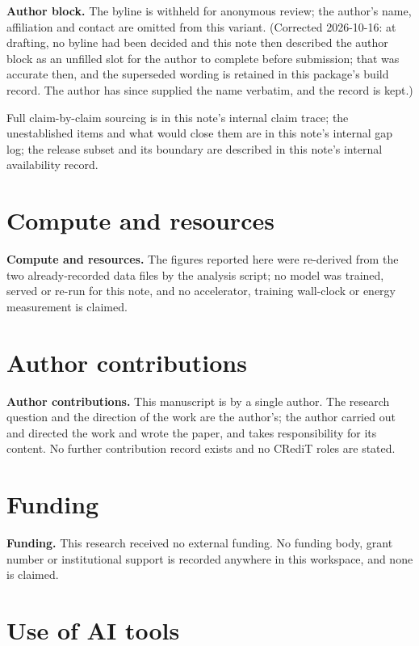 \documentclass[10pt]{article}
\begin{document}
\textbf{Author block.} The byline is withheld for anonymous review; the author's name, affiliation and contact are omitted from this variant. (Corrected 2026-10-16: at drafting, no byline had been decided and this note then described the author block as an unfilled slot for the author to complete before submission; that was accurate then, and the superseded wording is retained in this package's build record. The author has since supplied the name verbatim, and the record is kept.)

Full claim-by-claim sourcing is in this note's internal claim trace; the unestablished items and what would close them are in this note's internal gap log; the release subset and its boundary are described in this note's internal availability record.

\section*{Compute and resources}

\textbf{Compute and resources.} The figures reported here were re-derived from the two already-recorded data files by the analysis script; no model was trained, served or re-run for this note, and no accelerator, training wall-clock or energy measurement is claimed.

\section*{Author contributions}

\textbf{Author contributions.} This manuscript is by a single author. The research question and the direction of the work are the author's; the author carried out and directed the work and wrote the paper, and takes responsibility for its content. No further contribution record exists and no CRediT roles are stated.

\section*{Funding}

\textbf{Funding.} This research received no external funding. No funding body, grant number or institutional support is recorded anywhere in this workspace, and none is claimed.

\section*{Use of AI tools}
\end{document}
